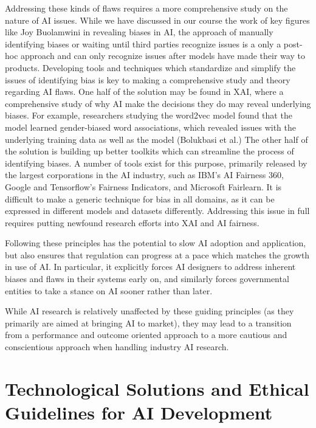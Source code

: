 \documentclass[10pt]{article}
\begin{document}
    Addressing these kinds of flaws requires a more comprehensive study on the nature of AI issues. While we have discussed in our course the work of key figures like Joy Buolamwini in revealing biases in AI, the approach of manually identifying biases or waiting until third parties recognize issues is a only a post-hoc approach and can only recognize issues after models have made their way to products. Developing tools and techniques which standardize and simplify the issues of identifying bias is key to making a comprehensive study and theory regarding AI flaws. One half of the solution may be found in XAI, where a comprehensive study of why AI make the decisions they do may reveal underlying biases. For example, researchers studying the word2vec model found that the model learned gender-biased word associations, which revealed issues with the underlying training data as well as the model (Bolukbasi et al.) The other half of the solution is building up better toolkits which can streamline the process of identifying biases. A number of tools exist for this purpose, primarily released by the largest corporations in the AI industry, such as IBM’s AI Fairness 360, Google and Tensorflow’s Fairness Indicators, and Microsoft Fairlearn. It is difficult to make a generic technique for bias in all domains, as it can be expressed in different models and datasets differently. Addressing this issue in full requires putting newfound research efforts into XAI and AI fairness.

    Following these principles has the potential to slow AI adoption and application, but also ensures that regulation can progress at a pace which matches the growth in use of AI. In particular, it explicitly forces AI designers to address inherent biases and flaws in their systems early on, and similarly forces governmental entities to take a stance on AI sooner rather than later.

    While AI research is relatively unaffected by these guiding principles (as they primarily are aimed at bringing AI to market), they may lead to a transition from a performance and outcome oriented approach to a more cautious and conscientious approach when handling industry AI research.

\section{Technological Solutions and Ethical Guidelines for AI Development}
\end{document}
